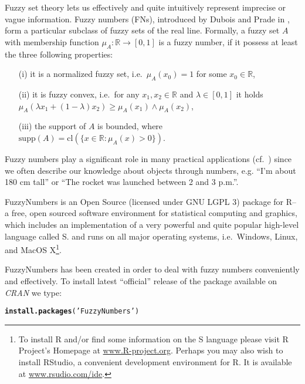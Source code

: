 \documentclass[11pt]{article}\usepackage{graphicx, color}
\makeatletter
\newcommand{\hlfunctioncall}[1]{\textcolor[rgb]{0.501960784313725,0,0.329411764705882}{\textbf{#1}}}%
\newcommand{\hlstring}[1]{\textcolor[rgb]{0.6,0.6,1}{#1}}%
\newenvironment{kframe}{%
 \def\at@end@of@kframe{}%
 \ifinner\ifhmode%
  \def\at@end@of@kframe{\end{minipage}}%
  \begin{minipage}{\columnwidth}%
 \fi\fi%
 \def\FrameCommand##1{\hskip\@totalleftmargin \hskip-\fboxsep
 \colorbox{shadecolor}{##1}\hskip-\fboxsep
     \hskip-\linewidth \hskip-\@totalleftmargin \hskip\columnwidth}%
 \MakeFramed {\advance\hsize-\width
   \@totalleftmargin\z@ \linewidth\hsize
   \@setminipage}}%
 {\par\unskip\endMakeFramed%
 \at@end@of@kframe}
\newenvironment{knitrout}{}{} %
\newcommand{\package}[1]{\textsf{#1}\xspace}
\newcommand{\program}[1]{\textsf{#1}\xspace}
\newcommand{\os}[1]{\textsf{#1}\xspace}
\newcommand{\lang}[1]{\textsf{#1}\xspace}
\newcommand{\R}{\lang{R}}
\makeatother
\begin{document}
Fuzzy set theory lets us effectively and quite intuitively represent
imprecise or vague information. Fuzzy numbers (FNs), introduced
by Dubois and Prade in \cite{DuboisPrade1978:opfn}, form a particular
subclass of fuzzy sets of the real line.
Formally, a fuzzy set $A$
with membership function $\mu_A:\mathbb{R}\to[0,1]$
is a fuzzy number, if it possess at least the three following properties:
\begin{itemize}
\item[(i)] it is a normalized fuzzy set,
i.e.~$\mu_A(x_0)=1$ for some $x_0\in\mathbb{R}$,
\item[(ii)] it is fuzzy convex, i.e.~for any $x_1,x_2\in\mathbb{R}$
and $\lambda\in[0,1]$ it holds
$\mu_A(\lambda x_1 + (1-\lambda) x_2) \ge \mu_A(x_1)\wedge \mu_A(x_2)$,
\item[(iii)] the support of $A$ is bounded,
where $\mathrm{supp}(A) = \mathrm{cl}(\{x\in\mathbb{R}: \mu_A(x)>0\})$.
\end{itemize}
Fuzzy numbers play a significant role
in many practical applications
(cf.~\cite{KlirYuan1995:fuzzybook})
since we often describe our knowledge about objects
through numbers, e.g. ``I'm about 180 cm tall''
or ``The rocket was launched between 2 and 3 p.m.''.




\bigskip
\package{FuzzyNumbers} is an Open Source (licensed under GNU LGPL 3)
package for \R -- a free, open sourced software environment
for statistical computing and graphics, which
includes an implementation
of a very powerful and quite popular high-level language called \lang{S}.
and runs on all major operating systems, i.e.~\os{Windows},
\os{Linux}, and \os{MacOS X}\footnote{%
To install \R and/or find some information on the \lang{S} language
please visit \R Project's Homepage at \href{http://www.R-project.org}{www.R-project.org}.
Perhaps you may also wish to install  \program{RStudio},
a convenient development environment for \R.
It is available at \href{http://www.rstudio.com/ide/}{www.rsudio.com/ide}.}.


\package{FuzzyNumbers} has been created in order to deal with fuzzy numbers
conveniently and effectively.
To install latest ``official'' release of the 
package available on \textit{CRAN} we type:

\begin{knitrout}\small
{}\color{fgcolor}\begin{kframe}
\begin{alltt}
\hlfunctioncall{install.packages}(\hlstring{'FuzzyNumbers'})
\end{alltt}
\end{kframe}
\end{knitrout}
\end{document}
